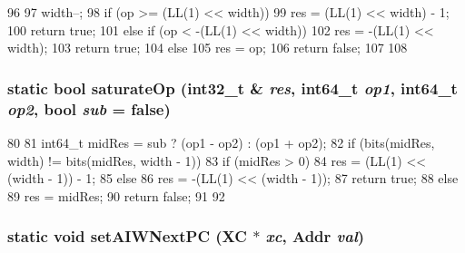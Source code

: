 \begin{DoxyCode}
96     {
97         width--;
98         if (op >= (LL(1) << width)) {
99             res = (LL(1) << width) - 1;
100             return true;
101         } else if (op < -(LL(1) << width)) {
102             res = -(LL(1) << width);
103             return true;
104         } else {
105             res = op;
106             return false;
107         }
108     }
\end{DoxyCode}
\hypertarget{classArmISA_1_1ArmStaticInst_ac89dee160ae86de9876da96a1df9ca67}{
\subsubsection[{saturateOp}]{\setlength{\rightskip}{0pt plus 5cm}static bool saturateOp (int32\_\-t \& {\em res}, \/  int64\_\-t {\em op1}, \/  int64\_\-t {\em op2}, \/  bool {\em sub} = {\ttfamily false})}}
\label{classArmISA_1_1ArmStaticInst_ac89dee160ae86de9876da96a1df9ca67}



\begin{DoxyCode}
80     {
81         int64_t midRes = sub ? (op1 - op2) : (op1 + op2);
82         if (bits(midRes, width) != bits(midRes, width - 1)) {
83             if (midRes > 0)
84                 res = (LL(1) << (width - 1)) - 1;
85             else
86                 res = -(LL(1) << (width - 1));
87             return true;
88         } else {
89             res = midRes;
90             return false;
91         }
92     }
\end{DoxyCode}
\hypertarget{classArmISA_1_1ArmStaticInst_a9345b4f7094d39b12eed323ddc30a6bf}{
\subsubsection[{setAIWNextPC}]{\setlength{\rightskip}{0pt plus 5cm}static void setAIWNextPC (XC $\ast$ {\em xc}, \/  {\bf Addr} {\em val})}}
\label{classArmISA_1_1ArmStaticInst_a9345b4f7094d39b12eed323ddc30a6bf}



